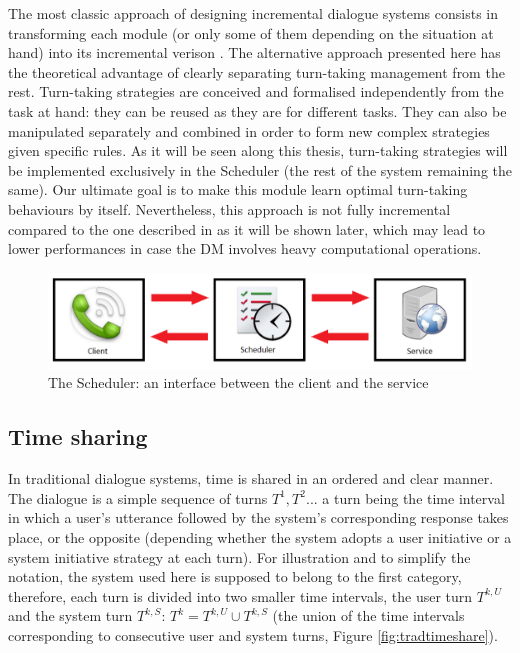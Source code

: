         The most classic approach of designing incremental dialogue systems consists in transforming each module (or only some of them depending on the situation at hand) into its incremental verison \cite{Schlangen2011}. The alternative approach presented here has the theoretical advantage of clearly separating turn-taking management from the rest. Turn-taking strategies are conceived and formalised independently from the task at hand: they can be reused as they are for different tasks. They can also be manipulated separately and combined in order to form new complex strategies given specific rules. As it will be seen along this thesis, turn-taking strategies will be implemented exclusively in the Scheduler (the rest of the system remaining the same). Our ultimate goal is to make this module learn optimal turn-taking behaviours by itself. Nevertheless, this approach is not fully incremental compared to the one described in \cite{Schlangen2011} as it will be shown later, which may lead to lower performances in case the DM involves heavy computational operations.
        
     	\begin{figure}[t]
          \centering
          \includegraphics[scale=0.4]{figures/ClientSchedService.pdf}
          \caption{The Scheduler: an interface between the client and the service}
          \label{fig:archioverview}
        \end{figure}
        
    \subsection{Time sharing}
    
    	In traditional dialogue systems, time is shared in an ordered and clear manner. The dialogue is a simple sequence of turns $T^1,T^2...$ a turn being the time interval in which a user's utterance followed by the system's corresponding response takes place, or the opposite (depending whether the system adopts a user initiative or a system initiative strategy at each turn). For illustration and to simplify the notation, the system used here is supposed to belong to the first category, therefore, each turn is divided into two smaller time intervals, the user turn $T^{k,U}$ and the system turn $T^{k,S}$: $T^k = T^{k,U} \cup T^{k,S}$ (the union of the time intervals corresponding to consecutive user and system turns, Figure \ref{fig:tradtimeshare}).
        
